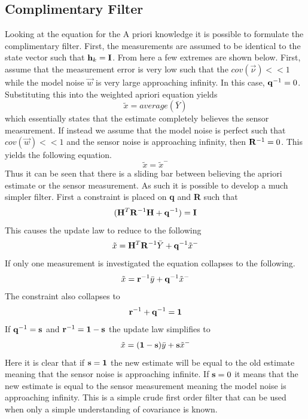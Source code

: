 \subsection{Complimentary Filter}

Looking at the equation for the A priori knowledge it is possible to
formulate the complimentary filter. First, the measurements are
assumed to be identical to the state vector such that ${\bf h}_k = {\bf
  I}$. From here a few extremes are shown below. First, assume that the measurement error is very low such
that the $cov(\vec{\nu})<<1$ while the model noise $\vec{w}$ is very
large approaching infinity. In this case, ${\bf q}^{-1} =0$. Substituting this into the weighted apriori equation yields
\begin{equation}
  \tilde{x} = average(\bar{Y})
\end{equation}
which essentially states that the estimate completely believes the
sensor measurement. If instead we assume that the model noise is
perfect such that $cov(\vec{w})<<1$ and the sensor noise is
approaching infinity, then ${\bf R}^{-1}=0$. This yields the following equation.
\begin{equation}
  \tilde{x} = \tilde{x}^{-}
\end{equation}
Thus it can be seen that there is a sliding bar between believing the
apriori estimate or the sensor measurement. As such it is possible to
develop a much simpler filter. First a constraint is placed on {\bf q}
and {\bf R} such that
\begin{equation}
  ({\bf H}^T{\bf R}^{-1}{\bf H}+{\bf q}^{-1}) = {\bf I}
\end{equation}
This causes the update law to reduce to the following
\begin{equation}
  \tilde{x} = {\bf H}^T{\bf R}^{-1}\bar{Y}+{\bf q}^{-1}\tilde{x}^{-}
\end{equation}
If only one measurement is investigated the equation collapses to the
following.
\begin{equation}
  \tilde{x} = {\bf r}^{-1}\bar{y}+{\bf q}^{-1}\tilde{x}^{-}
\end{equation}
The constraint also collapses to
\begin{equation}
  {\bf r}^{-1}+{\bf q}^{-1} = {\bf 1}
\end{equation}
If ${\bf q}^{-1} = {\bf s}$ and ${\bf r}^{-1}={\bf 1}-{\bf s}$ the
update law simplifies to
\begin{equation}
  \tilde{x} = ({\bf 1}-{\bf s})\bar{y}+{\bf s}\tilde{x}^{-}
\end{equation}
Here it is clear that if ${\bf s} = {\bf 1}$ the new estimate will be
equal to the old estimate meaning that the sensor noise is approaching
infinite. If ${\bf s} = 0$ it means that the new estimate is equal to
the sensor measurement meaning the model noise is approaching
infinity. This is a simple crude first order filter that can be used
when only a simple understanding of covariance is known.

